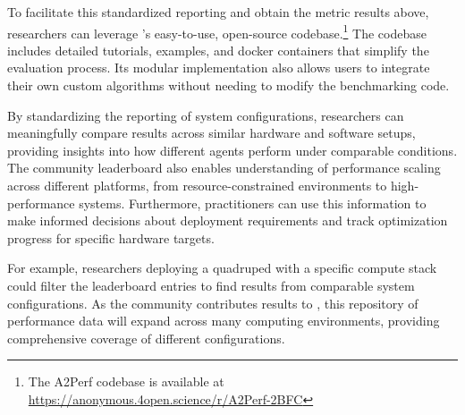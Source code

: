 To facilitate this standardized reporting and obtain the metric results above, researchers can leverage \method's easy-to-use, open-source codebase.\footnote{The A2Perf codebase is available at \url{https://anonymous.4open.science/r/A2Perf-2BFC}}
The codebase includes detailed tutorials, examples, and docker containers that simplify the evaluation process.
Its modular implementation also allows users to integrate their own custom algorithms without needing to modify the benchmarking code.

By standardizing the reporting of system configurations, researchers can meaningfully compare results across similar hardware and software setups, providing insights into how different agents perform under comparable conditions.
The community leaderboard also enables understanding of performance scaling across different platforms, from resource-constrained environments to high-performance systems.
Furthermore, practitioners can use this information to make informed decisions about deployment requirements and track optimization progress for specific hardware targets.

For example, researchers deploying a quadruped with a specific compute stack could filter the leaderboard entries to find results from comparable system configurations.
As the community contributes results to \method, this repository of performance data will expand across many computing environments, providing comprehensive coverage of different configurations.
